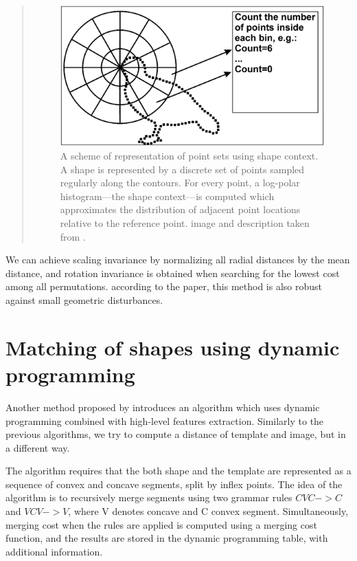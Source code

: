 \begin{quotation}
\begin{figure}
\centering
\includegraphics[width=\linewidth]{ext/polarbins.png}
\caption{A scheme of representation of point sets using shape context.
A shape is represented by a discrete set of points sampled regularly along
the contours. For every point, a log-polar histogram—the shape context—is
computed which approximates the distribution of adjacent point locations
relative to the reference point. image and description taken from \citet{simple}.}
\label{fig:polarbins}
\end{figure}
\end{quotation}

We can achieve scaling invariance by normalizing all radial distances by the mean distance, and rotation invariance is obtained when searching for the lowest cost among all permutations. according to the paper, this method is also robust against small geometric disturbances.

\section{Matching of shapes using dynamic programming}
Another method proposed by \citet{convex} introduces an algorithm which uses dynamic programming combined with high-level features extraction. Similarly to the previous algorithms, we try to compute a distance of template and image, but in a different way.

The algorithm requires that the both shape and the template are represented as a sequence of convex and concave segments, split by inflex points. The idea of the algorithm is to recursively merge segments using two grammar rules $CVC -> C$ and $VCV -> V$, where V denotes concave and C convex segment. Simultaneously, merging cost when the rules are applied is computed using a merging cost function, and the results are stored in the dynamic programming table, with additional information.


